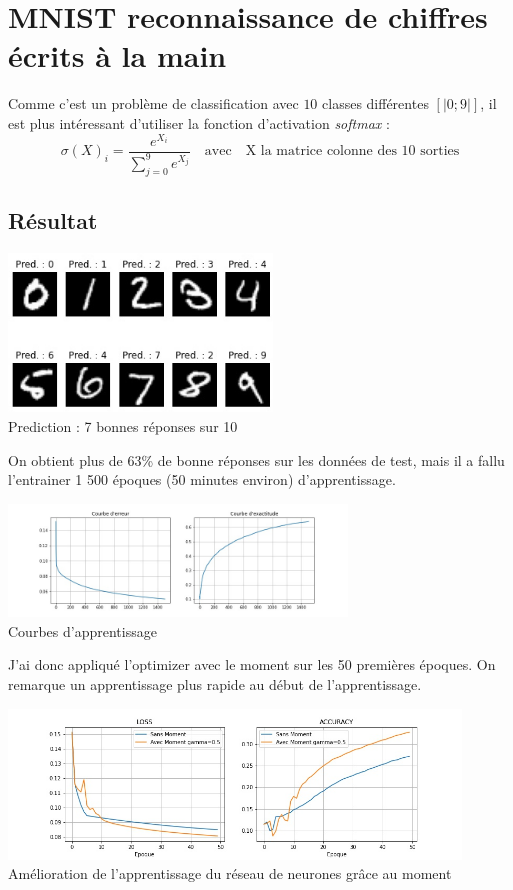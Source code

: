 \documentclass[12pt,a4paper, french]{article}
\begin{document}
\section{MNIST reconnaissance de chiffres écrits à la main}
Comme c'est un problème de classification avec $10$ classes différentes $[|0; 9|]$, il est plus intéressant d'utiliser la fonction d'activation \textit{softmax} :  
\begin{equation}
	\sigma(X)_i = \frac{e^{X_i}}{\sum_{j=0}^{9}{e^{X_j}}} 
	\quad \textrm{avec} \quad
	\textrm{X la matrice colonne des 10 sorties}
\end{equation}

\subsection{Résultat}

\begin{center}
    \includegraphics[width=7cm]{3-Prediction.jpg} \\
    Prediction : 7 bonnes réponses sur 10
\end{center}

On obtient plus de 63\% de bonne réponses sur les données de test, mais il a fallu l'entrainer 1 500 époques (50 minutes environ) d'apprentissage.

\begin{center}
    \includegraphics[width=9cm]{3-apprentissage.jpg} \\
    Courbes d'apprentissage
\end{center}

J'ai donc appliqué l'optimizer avec le moment sur les 50 premières époques. On remarque un apprentissage plus rapide au début de l'apprentissage.

\begin{center}
    \includegraphics[width=12cm]{3-MNIST moment vs sans.jpg} \\
    Amélioration de l'apprentissage du réseau de neurones grâce au moment
\end{center}
\end{document}
